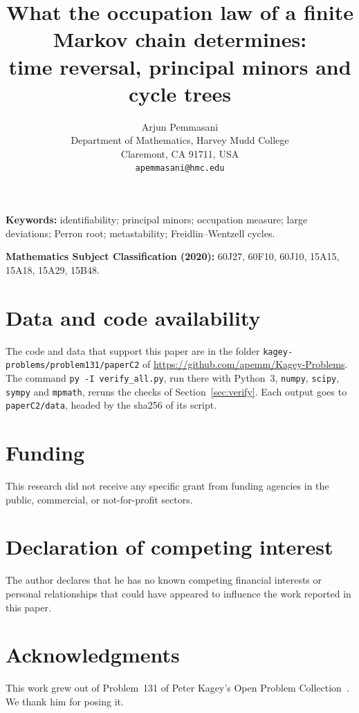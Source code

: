 \documentclass[11pt]{article}
\title{What the occupation law of a finite Markov chain determines:\\ time reversal, principal minors and cycle trees}
\author{Arjun Pemmasani\\[2pt]
\small Department of Mathematics, Harvey Mudd College\\
\small Claremont, CA 91711, USA\\
\small \texttt{apemmasani@hmc.edu}}
\date{}
\theoremstyle{definition}
\theoremstyle{remark}
\begin{document}
\maketitle

\begin{abstract}

\end{abstract}

\medskip
\noindent\textbf{Keywords:} identifiability; principal minors; occupation measure; large
deviations; Perron root; metastability; Freidlin--Wentzell cycles.

\noindent\textbf{Mathematics Subject Classification (2020):} 60J27, 60F10, 60J10, 15A15, 15A18,
15A29, 15B48.










\section*{Data and code availability}

The code and data that support this paper are in the folder
\nolinkurl{kagey-problems/problem131/paperC2} of
\url{https://github.com/apemm/Kagey-Problems}. The command
\texttt{py -I verify\_all.py}, run there with Python~3, \texttt{numpy}, \texttt{scipy},
\texttt{sympy} and \texttt{mpmath}, reruns the checks of Section~\ref{sec:verify}. Each
output goes to \nolinkurl{paperC2/data}, headed by the sha256 of its script.

\section*{Funding}

This research did not receive any specific grant from funding agencies in the
public, commercial, or not-for-profit sectors.

\section*{Declaration of competing interest}

The author declares that he has no known competing financial interests or
personal relationships that could have appeared to influence the work reported
in this paper.

\section*{Acknowledgments}

This work grew out of Problem~131 of Peter Kagey's Open Problem
Collection~\cite{kagey131}. We thank him for posing it.


\end{document}
